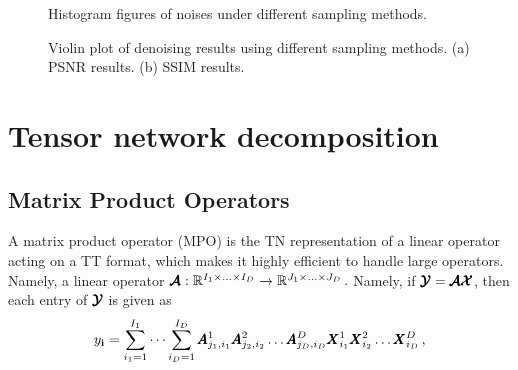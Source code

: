 \begin{figure}[h]
    \centering


    \caption{Histogram figures of noises under different sampling methods.}
    \label{fig:app-sampling}
\end{figure}


\begin{figure}[h]
    \centering
    \hspace{2em}
    \caption{Violin plot of denoising results using different sampling methods. (a) PSNR results. (b) SSIM results.}
    \label{fig:app-denoising}
\end{figure}

\section{Tensor network decomposition}\label{app:TN}


\subsection{Matrix Product Operators}
A matrix product operator (MPO) \cite{mcculloch2008infinite,hubig2017generic} is the TN representation of
a linear operator acting on a TT format, which makes it highly efficient to handle large operators.
Namely, a linear operator
\(
\pmb{\mathcal{A}}: \mathbb{R}^{I_1 \times \ldots \times I_D} \to \mathbb{R}^{J_1 \times \ldots \times J_D} \,.
\)
Namely, if $\pmb{\mathcal{Y}}=\pmb{\mathcal{A}}\pmb{\mathcal{X}}$, then each entry of $\pmb{\mathcal{Y}}$ is given as
\[
{y}_{\mathbf{i}}= \sum_{i_1=1}^{I_1} \cdots \sum_{i_D=1}^{I_D} \pmb{A}^1_{j_1,i_1} \pmb{A}^2_{j_2,i_2} \ldots \pmb{A}^D_{j_D,i_D} \pmb{X}^1_{i_1} \pmb{X}^2_{i_2} \ldots \pmb{X}^D_{i_D}  \,,
\]

